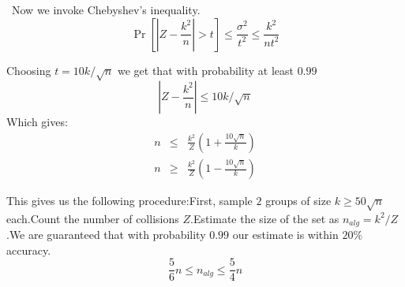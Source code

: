 \documentclass{article}
\begin{document}
\noindent  Now we invoke Chebyshev's inequality.\begin{equation}\Pr[|Z - \frac{k^2}{n}| > t] \le \frac{\sigma^2}{t^2} \le \frac{k^2}{nt^2}\end{equation}

\noindent Choosing $t = 10k/\sqrt{n}$ we get that with probability at least $0.99$\begin{equation}|Z - \frac{k^2}{n}| \le 10k/\sqrt{n}\end{equation}Which gives:\begin{eqnarray}n &\le& \frac{k^2}{Z}(1+\frac{10\sqrt{n}}{k}) \\n &\ge& \frac{k^2}{Z}(1-\frac{10\sqrt{n}}{k})\end{eqnarray}


\noindent This gives us the following procedure:First, sample $2$ groups of size $k \ge 50\sqrt{n}$ each.Count the number of collisions $Z$.Estimate the size of the set as $n_{alg} = k^2/Z$.We are guaranteed that with probability $0.99$ our estimate is within $20\%$ accuracy.\begin{equation}\frac{5}{6}n \le n_{alg} \le \frac{5}{4}n\end{equation}
\end{document}
